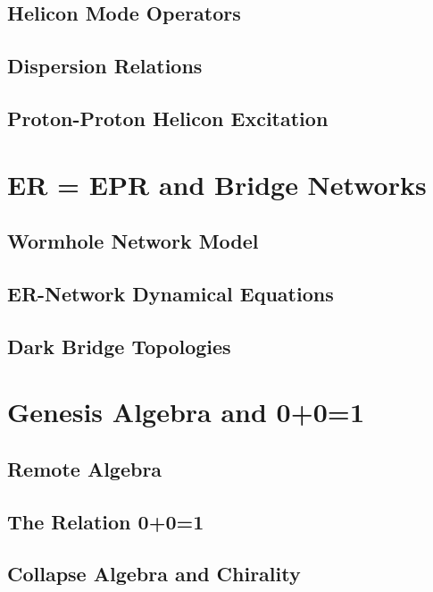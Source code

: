 \subsection{Helicon Mode Operators}

\subsection{Dispersion Relations}

\subsection{Proton-Proton Helicon Excitation}

\section{ER = EPR and Bridge Networks}
\label{app:er-epr}

\subsection{Wormhole Network Model}

\subsection{ER-Network Dynamical Equations}

\subsection{Dark Bridge Topologies}

\section{Genesis Algebra and 0+0=1}
\label{app:genesis-algebra}

\subsection{Remote Algebra}

\subsection{The Relation 0+0=1}

\subsection{Collapse Algebra and Chirality}

